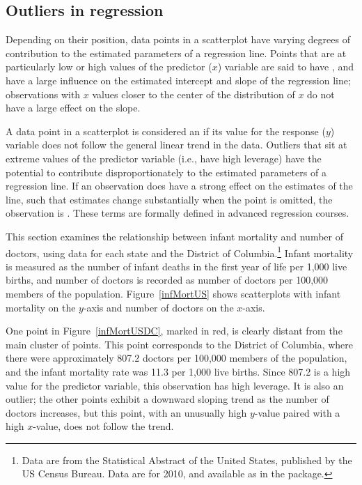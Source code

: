 \subsection{Outliers in regression}

Depending on their position, data points in a scatterplot have varying degrees of contribution to the estimated parameters of a regression line. Points that are at particularly low or high values of the predictor ($x$) variable are said to have , and have a large influence on the estimated intercept and slope of the regression line; observations with $x$ values closer to the center of the distribution of $x$ do not have a large effect on the slope. 

\textD{\newpage}

A data point in a scatterplot is considered an  if its value for the response ($y$) variable does not follow the general linear trend in the data. Outliers that sit at extreme values of the predictor variable (i.e., have high leverage) have the potential to contribute disproportionately to the estimated parameters of a regression line. If an observation does have a strong effect on the estimates of the line, such that estimates change substantially when the point is omitted, the observation is . These terms are formally defined in advanced regression courses.

This section examines the relationship between infant mortality and number of doctors, using data for each state and the District of Columbia.\footnote{Data are from the Statistical Abstract of the United States, published by the US Census Bureau. Data are for 2010, and available as  in the  package.} Infant mortality is measured as the number of infant deaths in the first year of life per 1,000 live births, and number of doctors is recorded as number of doctors per 100,000 members of the population. Figure~\ref{infMortUS} shows scatterplots with infant mortality on the $y$-axis and number of doctors on the $x$-axis. 

One point in Figure~\ref{infMortUSDC}, marked in red, is clearly distant from the main cluster of points. This point corresponds to the District of Columbia, where there were approximately 807.2 doctors per 100,000 members of the population, and the infant mortality rate was 11.3 per 1,000 live births. Since 807.2 is a high value for the predictor variable, this observation has high leverage. It is also an outlier; the other points exhibit a downward sloping trend as the number of doctors increases, but this point, with an unusually high $y$-value paired with a high $x$-value, does not follow the trend.

